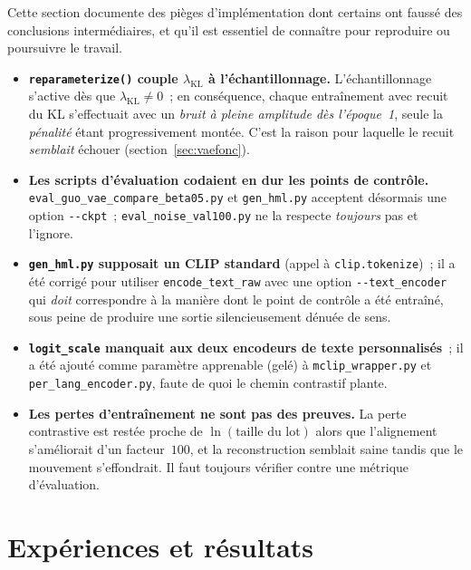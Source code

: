 \documentclass[12pt,a4paper,oneside]{report}
\theoremstyle{definition}
\theoremstyle{plain}
\newcommand{\lkl}{\ensuremath{\lambda_{\mathrm{KL}}}}
\begin{document}
Cette section documente des pièges d'implémentation dont certains ont faussé des
conclusions intermédiaires, et qu'il est essentiel de connaître pour reproduire
ou poursuivre le travail.

\begin{itemize}[leftmargin=*]
\item \textbf{\texttt{reparameterize()} couple \lkl{} à l'échantillonnage.}
L'échantillonnage s'active dès que $\lkl\neq0$~; en conséquence, chaque
entraînement avec recuit du KL s'effectuait avec un \emph{bruit à pleine
amplitude dès l'époque~1}, seule la \emph{pénalité} étant progressivement montée.
C'est la raison pour laquelle le recuit \emph{semblait} échouer
(section~\ref{sec:vaefonc}).
\item \textbf{Les scripts d'évaluation codaient en dur les points de contrôle.}
\texttt{eval\_guo\_vae\_compare\_beta05.py} et \texttt{gen\_hml.py} acceptent
désormais une option \texttt{-{}-ckpt}~; \texttt{eval\_noise\_val100.py} ne la
respecte \emph{toujours} pas et l'ignore.
\item \textbf{\texttt{gen\_hml.py} supposait un CLIP standard} (appel à
\texttt{clip.tokenize})~; il a été corrigé pour utiliser
\texttt{encode\_text\_raw} avec une option \texttt{-{}-text\_encoder} qui
\emph{doit} correspondre à la manière dont le point de contrôle a été entraîné,
sous peine de produire une sortie silencieusement dénuée de sens.
\item \textbf{\texttt{logit\_scale} manquait aux deux encodeurs de texte
personnalisés}~; il a été ajouté comme paramètre apprenable (gelé) à
\texttt{mclip\_wrapper.py} et \texttt{per\_lang\_encoder.py}, faute de quoi le
chemin contrastif plante.
\item \textbf{Les pertes d'entraînement ne sont pas des preuves.} La perte
contrastive est restée proche de $\ln(\text{taille du lot})$ alors que
l'alignement s'améliorait d'un facteur~$100$, et la reconstruction semblait saine
tandis que le mouvement s'effondrait. Il faut toujours vérifier contre une
métrique d'évaluation.
\end{itemize}

\chapter{Expériences et résultats}
\label{ch:resultats}
\end{document}
